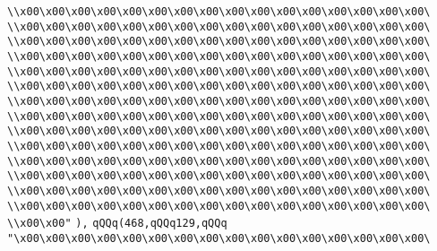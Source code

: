 \verb|\\x00\x00\x00\x00\x00\x00\x00\x00\x00\x00\x00\x00\x00\x00\x00\x00\|\newline
\verb|\\x00\x00\x00\x00\x00\x00\x00\x00\x00\x00\x00\x00\x00\x00\x00\x00\|\newline
\verb|\\x00\x00\x00\x00\x00\x00\x00\x00\x00\x00\x00\x00\x00\x00\x00\x00\|\newline
\verb|\\x00\x00\x00\x00\x00\x00\x00\x00\x00\x00\x00\x00\x00\x00\x00\x00\|\newline
\verb|\\x00\x00\x00\x00\x00\x00\x00\x00\x00\x00\x00\x00\x00\x00\x00\x00\|\newline
\verb|\\x00\x00\x00\x00\x00\x00\x00\x00\x00\x00\x00\x00\x00\x00\x00\x00\|\newline
\verb|\\x00\x00\x00\x00\x00\x00\x00\x00\x00\x00\x00\x00\x00\x00\x00\x00\|\newline
\verb|\\x00\x00\x00\x00\x00\x00\x00\x00\x00\x00\x00\x00\x00\x00\x00\x00\|\newline
\verb|\\x00\x00\x00\x00\x00\x00\x00\x00\x00\x00\x00\x00\x00\x00\x00\x00\|\newline
\verb|\\x00\x00\x00\x00\x00\x00\x00\x00\x00\x00\x00\x00\x00\x00\x00\x00\|\newline
\verb|\\x00\x00\x00\x00\x00\x00\x00\x00\x00\x00\x00\x00\x00\x00\x00\x00\|\newline
\verb|\\x00\x00\x00\x00\x00\x00\x00\x00\x00\x00\x00\x00\x00\x00\x00\x00\|\newline
\verb|\\x00\x00\x00\x00\x00\x00\x00\x00\x00\x00\x00\x00\x00\x00\x00\x00\|\newline
\verb|\\x00\x00\x00\x00\x00\x00\x00\x00\x00\x00\x00\x00\x00\x00\x00\x00\|\newline
\verb|\\x00\x00"|\newline
\verb|),|\newline
\verb|qQQq(468,qQQq129,qQQq|\newline
\verb|"\x00\x00\x00\x00\x00\x00\x00\x00\x00\x00\x00\x00\x00\x00\x00\x00\|\newline
